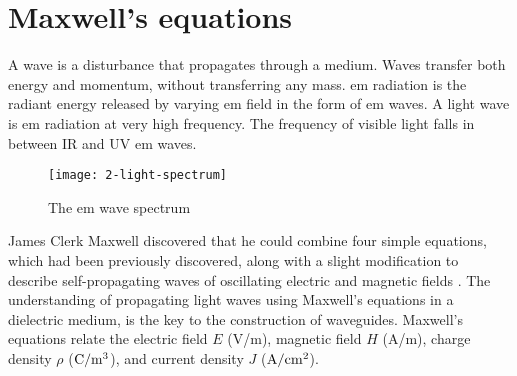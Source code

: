 \documentclass[../report.tex]{subfiles}
\begin{document}
	\section{Maxwell's equations}
A wave is a disturbance that propagates through a medium. Waves transfer both energy and momentum, without transferring any mass. \gls{em} radiation is the radiant energy released by varying \gls{em} field in the form of \gls{em} waves. A light wave is \gls{em} radiation at very high frequency. The frequency of visible light falls in between IR and UV \gls{em} waves.
\begin{figure}[h]
	\centering
	\texttt{[image: 2-light-spectrum]}
	\caption{The \gls{em} wave spectrum}
	\label{fig:2_light_spectrum}
\end{figure}
James Clerk Maxwell discovered that he could combine four simple equations, which had been previously discovered, along with a slight modification to describe self-propagating waves of oscillating electric and magnetic fields \cite{waveparticle_2016}. The understanding of propagating light waves using Maxwell's equations in a dielectric medium, is the key to the construction of waveguides. Maxwell’s equations relate the electric field $E$ (V/m), magnetic field $H$ (A/m), charge density $\rho$ ($\mathrm{C/m^3}$), and current density $J$ ($\mathrm{A/cm^2}$).
\end{document}
